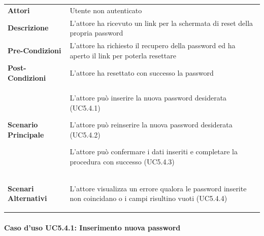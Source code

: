 \begin{minipage}{\linewidth}
	\begin{longtable}{ l | p{11cm}}
		\hline
		\rowcolor{Gray}
		\multicolumn{2}{c}{UC5.4 - Reset password} \\
		\hline
		\textbf{Attori} & Utente non autenticato \\
		\textbf{Descrizione} & L'attore ha ricevuto un link per la schermata di reset della propria password \\
		\textbf{Pre-Condizioni} & L'attore ha richiesto il recupero della password ed ha aperto il link per poterla resettare \\
		\textbf{Post-Condizioni} & L'attore ha resettato con successo la password \\
		\textbf{Scenario Principale} & 
		\begin{enumerate*}[label=(\arabic*.),itemjoin={\newline}]
			\item L'attore può inserire la nuova password desiderata (UC5.4.1)
			\item L'attore può reinserire la nuova password desiderata (UC5.4.2)
			\item L'attore può confermare i dati inseriti e completare la procedura con successo (UC5.4.3)
		\end{enumerate*}\\
		\textbf{Scenari Alternativi} & 
		\begin{enumerate*}[label=(\arabic*.),itemjoin={\newline}]
			\item L'attore visualizza un errore qualora le password inserite non coincidano o i campi risultino vuoti (UC5.4.4)
		\end{enumerate*}\\
	\end{longtable}
\end{minipage}

\paragraph{Caso d'uso UC5.4.1: Inserimento nuova password}
\label{UC5_4_1}

